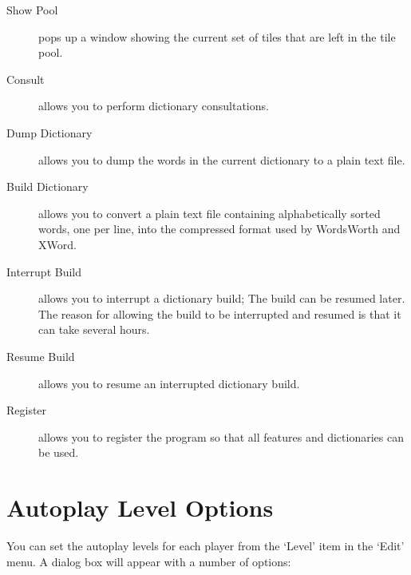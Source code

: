 \begin{description}
\item [Show Pool] pops up a window showing the current set of
tiles that are left in the tile pool.
\item [Consult] allows you to perform dictionary consultations.
\item [Dump Dictionary] allows you to dump the words in the current
dictionary to a plain text file.
\item [Build Dictionary] allows you to convert a plain text file
containing alphabetically sorted words, one per line, into the
compressed format used by WordsWorth and XWord.
\item [Interrupt Build] allows you to interrupt a dictionary build;
The build can be resumed later. The reason for allowing the build
to be interrupted and resumed is that it can take several hours.
\item [Resume Build] allows you to resume an interrupted dictionary build.
\item [Register] allows you to register the program so that all
features and dictionaries can be used.
\end{description}

\section{Autoplay Level Options}

You can set the autoplay levels for each player from the `Level' item
in the `Edit' menu. A dialog box will appear with a number of
options:

